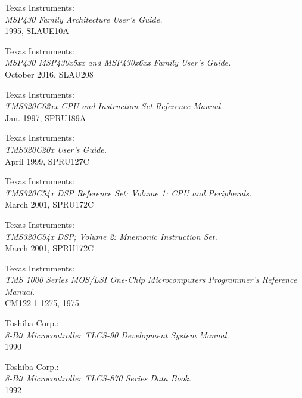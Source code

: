  Texas Instruments: \\
                       {\em MSP430 Family Architecture User's Guide.\/} \\
                       1995, SLAUE10A

 Texas Instruments: \\
                 {\em MSP430 MSP430x5xx and MSP430x6xx Family
                  User's Guide.\/} \\
                 October 2016, SLAU208

 Texas Instruments: \\
                {\em TMS320C62xx CPU and Instruction Set Reference
                 Manual.\/} \\
                Jan. 1997, SPRU189A

 Texas Instruments: \\
                 {\em TMS320C20x User's Guide.\/} \\
                 April 1999, SPRU127C

 Texas Instruments: \\
                     {\em TMS320C54x DSP Reference Set;
                     Volume 1: CPU and Peripherals.\/} \\
                     March 2001, SPRU172C

 Texas Instruments: \\
                     {\em TMS320C54x DSP; Volume 2: Mnemonic Instruction
                     Set.\/} \\
                     March 2001, SPRU172C

 Texas Instruments: \\
                     {\em TMS 1000 Series MOS/LSI One-Chip
                     Microcomputers Programmer's Reference
                     Manual.\/} \\
                     CM122-1 1275, 1975

 Toshiba Corp.: \\
                 {\em 8-Bit Microcontroller TLCS-90 Development System
                 Manual.\/} \\
                 1990

 Toshiba Corp.: \\
                  {\em 8-Bit Microcontroller TLCS-870 Series Data
                  Book.\/} \\
                  1992

